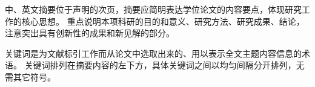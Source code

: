 \begin{cabstract}
  中、英文摘要位于声明的次页，摘要应简明表达学位论文的内容要点，体现研究工作的核心思想。
  重点说明本项科研的目的和意义、研究方法、研究成果、结论，注意突出具有创新性的成果和新见解的部分。

  关键词是为文献标引工作而从论文中选取出来的、用以表示全文主题内容信息的术语。
  关键词排列在摘要内容的左下方，具体关键词之间以均匀间隔分开排列，无需其它符号。
\end{cabstract}